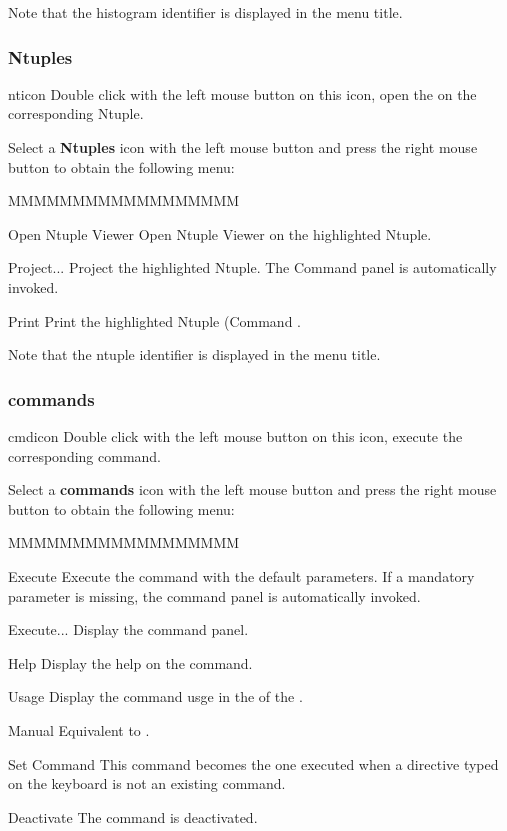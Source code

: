 Note that the histogram identifier is displayed in the menu title.


\subsubsection{Ntuples}
\begin{ICON}{nticon}
Double click with the left mouse button on this icon, open the \NV{} on the
corresponding Ntuple.
\end{ICON}

Select a {\bf Ntuples} icon with the left mouse button and press
the right mouse button to obtain the following menu:


\begin{DLsf}{MMMMMMMMMMMMMMMMMM}
\item[Open Ntuple Viewer]    Open Ntuple Viewer on the highlighted Ntuple.
\item[Project...]            Project the highlighted Ntuple. The Command
                             panel  is automatically invoked.
\item[Print]                 Print the highlighted Ntuple (Command
                             .
\end{DLsf}

Note that the ntuple identifier is displayed in the menu title.


\subsubsection{\XPAW{} commands}
\begin{ICON}{cmdicon}
Double click with the left mouse button on this icon, execute the corresponding
\XPAW{} command.
\end{ICON}

Select a {\bf \XPAW{} commands} icon with the left mouse button and press
the right mouse button to obtain the following menu:


\begin{DLsf}{MMMMMMMMMMMMMMMMMM}
\item[Execute]      Execute the command with the default parameters. If
                    a mandatory parameter is missing, the command panel
                    is automatically invoked.
\item[Execute...]   Display the command panel.
\item[Help]         Display the help on the command.
\item[Usage]        Display the command usge in the \TP{} of the \EW.
\item[Manual]       Equivalent to .
\item[Set Command]  This command becomes the one executed when a directive
                    typed on the keyboard is not an existing \XPAW{} command.
\item[Deactivate]   The command is deactivated.
\end{DLsf}

